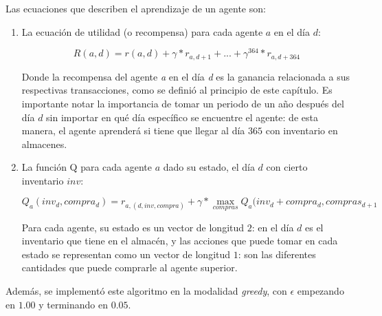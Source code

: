 Las ecuaciones que describen el aprendizaje de un agente son:

\begin{enumerate}
    \item La ecuaci\'on de utilidad (o recompensa) para cada agente $a$ en el d\'ia $d$:

$$
R(a, d) = r(a,d) + \gamma*r_{a, d+1} + ... + \gamma^{364}*r_{a,d+364}
$$

Donde la recompensa del agente \textit{a} en el d\'ia \textit{d} es la ganancia relacionada a sus respectivas transacciones, como se defini\'o al principio de este cap\'itulo. Es importante notar la importancia de tomar un periodo de un a\~no despu\'es del d\'ia $d$ sin importar en qu\'e d\'ia espec\'ifico se encuentre el agente: de esta manera, el agente aprender\'a si tiene que llegar al d\'ia $365$ con inventario en almacenes.

    \item La funci\'on Q para cada agente $a$ dado su estado, el d\'ia $d$ con cierto inventario $inv$:

$$
Q_{a}(inv_{d},compra_{d}) = r_{a, (d, inv, compra)} + \gamma * \max_{compras}{Q_{a}(inv_{d} + compra_{d}, compras_{d+1}}
$$

Para cada agente, su estado es un vector de longitud $2$: en el d\'ia $d$ es el inventario que tiene en el almac\'en, y las acciones que puede tomar en cada estado se representan como un vector de longitud $1$: son las diferentes cantidades que puede comprarle al agente superior.
\end{enumerate}

Adem\'as, se implement\'o este algoritmo en la modalidad \textit{greedy}, con $\epsilon$ empezando en $1.00$ y terminando en $0.05$.

